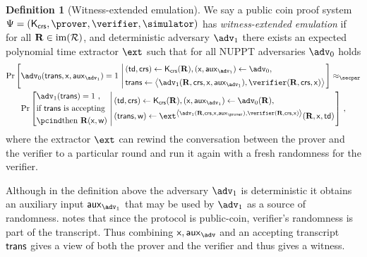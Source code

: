 \documentclass[runningheads,11pt]{llncs}
\theoremstyle{definition}
\newtheorem{definition}[theorem]{Definition}
\begin{document}
\begin{definition}[Witness-extended emulation]
	\label{def:wit_ext_em}
	We say a public coin proof system $\proofsystem = (\kcrs, \prover, \verifier, \simulator)$ has \emph{witness-extended emulation} if for all $\mathbf{R} \in \operatorname{im}(\mathcal{R})$, and deterministic adversary $\adv_1$ there exists an expected polynomial time extractor $\ext$ such that for all NUPPT adversaries $\adv_0$ holds
		\begin{multline*}
		\Pr\left[\adv_0 (\trans, \inp, \aux_{\adv_1}) = 1 \,\left|\,
		\begin{aligned}
				& (\td, \crs) \gets \kcrs(\REL), (\inp, \aux_{\adv_1}) \gets \adv_0, \\
				& \trans \gets \ip{\adv_1(\REL, \crs, \inp, \aux_{\adv_1})}{\verifier(\REL, \crs, \inp)}
			\end{aligned}
		\right.
		\right]
		 \approx_\secpar \\
		 \Pr\left[
			\begin{aligned}
				& \adv_1 (\trans) = 1\ , \\
				& \text{if $\trans$ is accepting} \\
				& \pcind \text{then $\REL(\inp, \wit)$}
			\end{aligned}\,\left|\,
			\begin{aligned}
				& (\td, \crs) \gets \kcrs(\REL), (\inp, \aux_{\adv_1}) \gets \adv_0(\REL), \\
				& (\trans, \wit )\gets \ext^{\ip{\adv_1(\REL, \crs, \inp, \aux_\prover)}{\verifier(\REL, \crs, \inp)}}(\REL, \inp, \td)
			\end{aligned}
			\vphantom{\begin{aligned}
				\adv (\trans) = 1, \\
				\text{if $\trans{}$ is accepting} \\
				\pcind \text{then $\REL(\inp, \wit)$}
			\end{aligned}}\right.
			\right]\,,
\end{multline*}
where the extractor $\ext$ can rewind the conversation between the prover and the verifier to a particular round and run it again with a fresh randomness for the verifier.
\end{definition}
Although in the definition above the adversary $\adv_1$ is deterministic it obtains an auxiliary input $\aux_{\adv_1}$ that may be used by $\adv_1$ as a source of randomness. \cite{EC:GroIsh08} notes that since the protocol is public-coin, verifier's randomness is part of the transcript. Thus combining $\inp, \aux_\adv$ and an accepting transcript $\mathsf{trans}$ gives a view of both the prover and the verifier and thus gives a witness.
\end{document}

